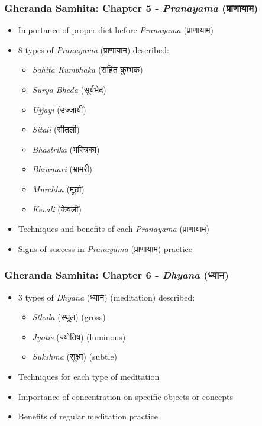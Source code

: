 \begin{frame}[fragile]\frametitle{Gheranda Samhita: Chapter 5 - \textit{Pranayama} (प्राणायाम)}
\begin{itemize}
    \item Importance of proper diet before \textit{Pranayama} (प्राणायाम)
    \item 8 types of \textit{Pranayama} (प्राणायाम) described:
    \begin{itemize}
        \item \textit{Sahita Kumbhaka} (सहित कुम्भक)
        \item \textit{Surya Bheda} (सूर्यभेद)
        \item \textit{Ujjayi} (उज्जायी)
        \item \textit{Sitali} (सीतली)
        \item \textit{Bhastrika} (भस्त्रिका)
        \item \textit{Bhramari} (भ्रामरी)
        \item \textit{Murchha} (मूर्छा)
        \item \textit{Kevali} (केवली)
    \end{itemize}
    \item Techniques and benefits of each \textit{Pranayama} (प्राणायाम)
    \item Signs of success in \textit{Pranayama} (प्राणायाम) practice
\end{itemize}
\end{frame}


\begin{frame}[fragile]\frametitle{Gheranda Samhita: Chapter 6 - \textit{Dhyana} (ध्यान)}
\begin{itemize}
    \item 3 types of \textit{Dhyana} (ध्यान) (meditation) described:
    \begin{itemize}
        \item \textit{Sthula} (स्थूल) (gross)
        \item \textit{Jyotis} (ज्योतिष) (luminous)
        \item \textit{Sukshma} (सूक्ष्म) (subtle)
    \end{itemize}
    \item Techniques for each type of meditation
    \item Importance of concentration on specific objects or concepts
    \item Benefits of regular meditation practice
\end{itemize}
\end{frame}

